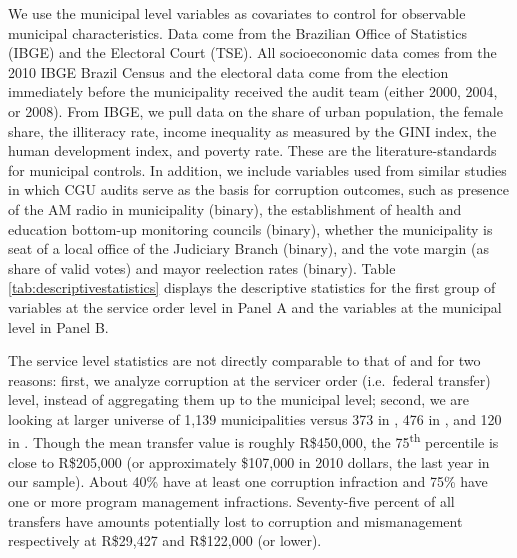 \documentclass[11pt]{article}
\begin{document}
We use the municipal level variables as covariates to control for observable municipal characteristics. Data come from the Brazilian Office of Statistics (IBGE) and the Electoral Court (TSE). All socioeconomic data comes from the 2010 IBGE Brazil Census and the electoral data come from the election immediately before the municipality received the audit team (either 2000, 2004, or 2008). From IBGE, we pull data on the share of urban population, the female share, the illiteracy rate, income inequality as measured by the GINI index, the human development index, and poverty rate. These are the literature-standards for municipal controls. In addition, we include variables used from similar studies in which CGU audits serve as the basis for corruption outcomes, such as presence of the AM radio in municipality (binary), the establishment of health and education bottom-up monitoring councils (binary), whether the municipality is seat of a local office of the Judiciary Branch (binary), and the vote margin (as share of valid votes) and mayor reelection rates (binary). Table \ref{tab:descriptivestatistics} displays the descriptive statistics for the first group of variables at the service order level in Panel A and the variables at the municipal level in Panel B.

The service level statistics are not directly comparable to that of \citet{FerrazExposingCorruptPoliticians2008b,FerrazElectoralAccountabilityCorruption2011a} and \citet{ZamboniAuditRiskRent2018} for two reasons: first, we analyze corruption at the servicer order (i.e.~federal transfer) level, instead of aggregating them up to the municipal level; second, we are looking at larger universe of 1,139 municipalities versus 373 in \citet{FerrazExposingCorruptPoliticians2008b}, 476 in \citet{FerrazElectoralAccountabilityCorruption2011a}, and 120 in \citet{ZamboniAuditRiskRent2018}. Though the mean transfer value is roughly R\$450,000, the 75\textsuperscript{th} percentile is close to R\$205,000 (or approximately \$107,000 in 2010 dollars, the last year in our sample). About 40\% have at least one corruption infraction and 75\% have one or more program management infractions. Seventy-five percent of all transfers have amounts potentially lost to corruption and mismanagement respectively at R\$29,427 and R\$122,000 (or lower).
\end{document}
